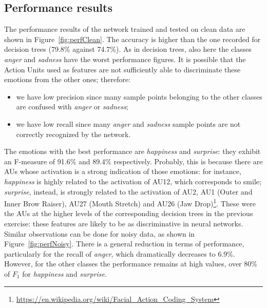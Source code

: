 \documentclass{article}
\begin{document}
\subsection{Performance results}
The performance results of the network trained and tested on clean data are shown in Figure~\ref{fig:perfClean}. The accuracy is higher than the one recorded for decision trees (79.8\% against 74.7\%). As in decision trees, also here the classes \emph{anger} and \emph{sadness} have the worst performance figures. It is possible that the Action Units used as features are not sufficiently able to discriminate these emotions from the other ones; therefore:
\begin{itemize}
	\item we have low precision since many sample points belonging to the other classes are confused with \emph{anger} or \emph{sadness};
	\item we have low recall since many \emph{anger} and \emph{sadness} sample points are not correctly recognized by the network.
\end{itemize}
The emotions with the best performance are \emph{happiness} and \emph{surprise}: they exhibit an F-measure of 91.6\% and 89.4\% respectively. Probably, this is because there are AUs whose activation is a strong indication of those emotions: for instance, \emph{happiness} is highly related to the activation of AU12, which corresponds to smile; \emph{surprise}, instead, is strongly related to the activation of AU2, AU1 (Outer and Inner Brow Raiser), AU27 (Mouth Stretch) and AU26 (Jaw Drop)\footnote{\url{https://en.wikipedia.org/wiki/Facial_Action_Coding_System}}. These were the AUs at the higher levels of the corresponding decision trees in the previous exercise: these features are likely to be as discriminative in neural networks.\\
Similar observations can be done for noisy data, as shown in Figure~\ref{fig:perfNoisy}. There is a general reduction in terms of performance, particularly for the recall of \emph{anger}, which dramatically decreases to 6.9\%. However, for the other classes the performance remains at high values, over 80\% of $F_1$ for \emph{happiness} and \emph{surprise}.
\end{document}
